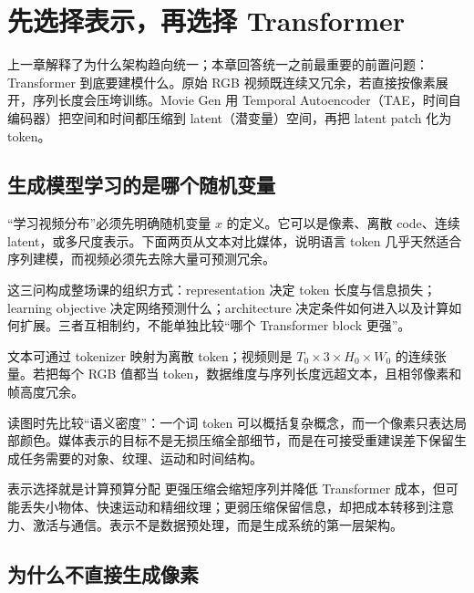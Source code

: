 \section{先选择表示，再选择 Transformer}

上一章解释了为什么架构趋向统一；本章回答统一之前最重要的前置问题：Transformer 到底要建模什么。原始 RGB 视频既连续又冗余，若直接按像素展开，序列长度会压垮训练。Movie Gen 用 Temporal Autoencoder（TAE，时间自编码器）把空间和时间都压缩到 latent（潜变量）空间，再把 latent patch 化为 token。

\subsection{生成模型学习的是哪个随机变量}

“学习视频分布”必须先明确随机变量 $x$ 的定义。它可以是像素、离散 code、连续 latent，或多尺度表示。下面两页从文本对比媒体，说明语言 token 几乎天然适合序列建模，而视频必须先去除大量可预测冗余。


这三问构成整场课的组织方式：representation 决定 token 长度与信息损失；learning objective 决定网络预测什么；architecture 决定条件如何进入以及计算如何扩展。三者互相制约，不能单独比较“哪个 Transformer block 更强”。


文本可通过 tokenizer 映射为离散 token；视频则是 $T_0\times3\times H_0\times W_0$ 的连续张量。若把每个 RGB 值都当 token，数据维度与序列长度远超文本，且相邻像素和帧高度冗余。


读图时先比较“语义密度”：一个词 token 可以概括复杂概念，而一个像素只表达局部颜色。媒体表示的目标不是无损压缩全部细节，而是在可接受重建误差下保留生成任务需要的对象、纹理、运动和时间结构。

\begin{importantbox}{表示选择就是计算预算分配}
更强压缩会缩短序列并降低 Transformer 成本，但可能丢失小物体、快速运动和精细纹理；更弱压缩保留信息，却把成本转移到注意力、激活与通信。表示不是数据预处理，而是生成系统的第一层架构。
\end{importantbox}

\subsection{为什么不直接生成像素}

